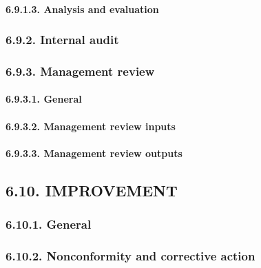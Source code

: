 \documentclass[
]{article}
\begin{document}
\hypertarget{analysis-and-evaluation}{%
\paragraph{6.9.1.3. Analysis and
evaluation}\label{analysis-and-evaluation}}

\hypertarget{internal-audit}{%
\subsubsection{6.9.2. Internal audit}\label{internal-audit}}

\hypertarget{management-review}{%
\subsubsection{6.9.3. Management review}\label{management-review}}

\hypertarget{general-7}{%
\paragraph{6.9.3.1. General}\label{general-7}}

\hypertarget{management-review-inputs}{%
\paragraph{6.9.3.2. Management review
inputs}\label{management-review-inputs}}

\hypertarget{management-review-outputs}{%
\paragraph{6.9.3.3. Management review
outputs}\label{management-review-outputs}}

\hypertarget{improvement}{%
\subsection{6.10. IMPROVEMENT}\label{improvement}}

\hypertarget{general-8}{%
\subsubsection{6.10.1. General}\label{general-8}}

\hypertarget{nonconformity-and-corrective-action}{%
\subsubsection{6.10.2. Nonconformity and corrective
action}\label{nonconformity-and-corrective-action}}
\end{document}
